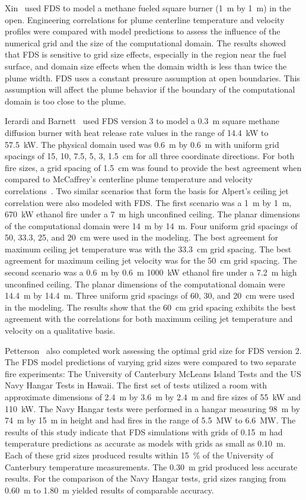 \documentclass[11pt]{book}
\begin{document}
Xin~\cite{Xin:NFPA2004}  used FDS  to  model a  methane fueled  square burner (1~m  by 1~m) in  the open. Engineering correlations  for plume
centerline temperature and velocity  profiles were compared with model predictions to assess the influence of the numerical grid and the size of the
computational domain. The  results showed that FDS is sensitive to grid size effects, especially  in the region near the fuel surface, and domain
size  effects when the domain width is  less than twice the plume  width.  FDS  uses   a  constant  pressure  assumption  at  open boundaries.  This
assumption  will affect  the plume  behavior  if the boundary of the computational domain is too close to the plume.

Ierardi  and Barnett~\cite{Ierardi:1} used  FDS version  3 to  model a 0.3~m square methane diffusion burner with heat release rate values in the
range of 14.4~kW to 57.5~kW. The physical domain used was 0.6~m by 0.6~m with uniform grid spacings of  15, 10, 7.5, 5, 3, 1.5~cm for all three
coordinate  directions. For both  fire sizes, a grid  spacing of 1.5~cm  was found  to  provide  the best  agreement  when compared  to McCaffrey's
centerline    plume    temperature     and    velocity correlations~\cite{SFPE:Heskestad}.  Two similar  scenarios  that form the basis for Alpert's
ceiling  jet correlation were also modeled with FDS. The first scenario was a  1~m by 1~m, 670~kW ethanol fire under a 7~m   high  unconfined
ceiling.   The  planar   dimensions  of   the computational domain were 14~m by  14~m. Four uniform grid spacings of 50, 33.3, 25, and 20~cm were
used in the modeling. The best agreement for  maximum  ceiling  jet  temperature  was  with  the  33.3~cm  grid spacing. The best  agreement for
maximum ceiling jet  velocity was for the  50~cm grid  spacing. The  second scenario  was a  0.6~m  by 0.6~m 1000~kW ethanol fire under a 7.2~m high
unconfined ceiling. The planar dimensions of  the computational domain  were 14.4~m by  14.4~m. Three uniform  grid  spacings  of  60,  30,  and
20~cm  were  used  in  the modeling. The  results show that  the 60~cm grid spacing  exhibits the best  agreement with  the correlations  for both
maximum  ceiling jet temperature and velocity on a qualitative basis.

Petterson~\cite{Petterson:1} also completed work assessing the optimal grid size for FDS version 2. The FDS model predictions of varying grid sizes
were  compared to two separate fire  experiments: The University of Canterbury  McLeans Island  Tests and the  US Navy Hangar  Tests in Hawaii.  The
first  set  of  tests utilized  a  room with  approximate dimensions of  2.4~m by  3.6~m by  2.4~m and fire  sizes of  55~kW and 110~kW. The  Navy
Hangar  tests were performed  in a  hangar measuring 98~m by 74~m by 15~m in height and had fires in the range of 5.5~MW to 6.6~MW. The results  of
this study indicate that  FDS simulations with grids of 0.15~m had temperature predictions as accurate as models with grids as  small as 0.10~m. Each
of these grid  sizes produced results within   15~\%   of   the   University   of   Canterbury   temperature measurements. The 0.30~m grid  produced
less accurate results. For the comparison of the Navy Hangar tests, grid sizes ranging from 0.60~m to 1.80~m yielded results of comparable accuracy.
\end{document}
